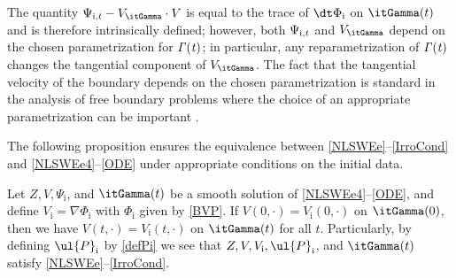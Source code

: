 \begin{remark}
The quantity $\Psi_{{\rm i},t} - V_\itGamma\cdot V$ is equal to the trace of $\dt\Phi_\mathrm{i}$ on $\itGamma(t)$ and is therefore intrinsically defined;
however, both $\Psi_{{\rm i},t} $ and $V_\itGamma$ depend on the chosen parametrization for $\it\Gamma(t)$;
in particular, any reparametrization of $\it\Gamma(t)$ changes the tangential component of $V_\itGamma$.
The fact that the tangential velocity of the boundary depends on the chosen parametrization is standard in the analysis of free boundary problems
where the choice of an appropriate parametrization can be important \cite{AmbroseMasmoudi,CordobaGancedo}.
\end{remark}

The following proposition ensures the equivalence between \eqref{NLSWEe}--\eqref{IrroCond} and \eqref{NLSWEe4}--\eqref{ODE} under appropriate conditions
on the initial data.

\begin{proposition}\label{prop:equiv}
Let $Z,V,\Psi_\mathrm{i}$, and $\itGamma(t)$ be a smooth solution of \eqref{NLSWEe4}--\eqref{ODE},
and define $V_\mathrm{i}=\nabla\Phi_\mathrm{i}$ with $\Phi_\mathrm{i}$ given by \eqref{BVP}.
If $V(0,\cdot)=V_\mathrm{i}(0,\cdot)$ on $\itGamma(0)$, then we have $V(t,\cdot)=V_\mathrm{i}(t,\cdot)$ on $\itGamma(t)$ for all $t$.
Particularly, by defining $\ul{P}_\mathrm{i}$ by \eqref{defPi} we see that $Z,V,V_\mathrm{i},\ul{P}_\mathrm{i}$, and $\itGamma(t)$ satisfy \eqref{NLSWEe}--\eqref{IrroCond}.
\end{proposition}

